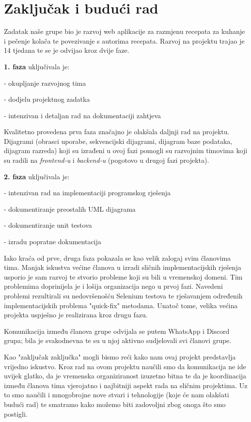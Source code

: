 
\chapter{Zaključak i budući rad}

Zadatak naše grupe bio je razvoj web aplikacije za razmjenu recepata za kuhanje
i pečenje kolača te povezivanje s autorima recepata. Razvoj na projektu trajao je 14 tjedana
te se je odvijao kroz dvije faze.

\bigbreak

\noindent\textbf{1. faza} uključivala je:

- okupljanje razvojnog tima

- dodjelu projektnog zadatka

- intenzivan i detaljan rad na dokumentaciji zahtjeva

\noindent Kvalitetno provedena prva faza značajno je olakšala daljnji rad na projektu.
Dijagrami (obrasci uporabe, sekvencijski dijagrami, dijagram baze podataka, dijagram razreda)
koji su izrađeni u ovoj fazi pomogli su razvojnim timovima koji su radili na \textit{frontend-u}
i \textit{backend-u} (pogotovo u drugoj fazi projekta).

\bigbreak

\noindent\textbf{2. faza} uključivala je:

- intenzivan rad na implementaciji programskog rješenja

- dokumentiranje preostalih UML dijagrama

- dokumentiranje unit testova

- izradu popratne dokumentacija

\noindent Iako kraća od prve, druga faza pokazala se kao velik zalogaj svim članovima tima.
Manjak iskustva većine članova u izradi sličnih implementacijskih rješenja usporio je sam razvoj te
stvorio probleme koji su bili u vremenskoj domeni. Tim problemima doprinijela je i lošija organizacija 
nego u prvoj fazi. Navedeni problemi rezultirali su nedovršenošću Selenium testova te rješavanjem
određenih implementacijskih problema "quick-fix" metodama. Unatoč tome, velika većina projekta
uspješno je realizirana kroz drugu fazu.

\bigbreak
Komunikacija između članova grupe odvijala se putem WhatsApp i Discord grupa; bila je svakodnevna
te su u njoj aktivno sudjelovali svi članovi grupe.

\bigbreak
Kao "zaključak zaključka" mogli bismo reći kako nam ovaj projekt predstavlja vrijedno iskustvo.
Kroz rad na ovom projektu naučili smo da komunikacija ne ide uvijek glatko, da je vremenska organiziranost
izuzetno bitna te da je koordinacija između članova tima vjerojatno i najbitniji aspekt rada na sličnim
projektima. Uz to smo naučili i mnogobrojne nove stvari i tehnologije (koje će nam olakšati budući rad)
te smatramo kako možemo biti zadovoljni zbog onoga što smo postigli.


\medbreak



\eject 